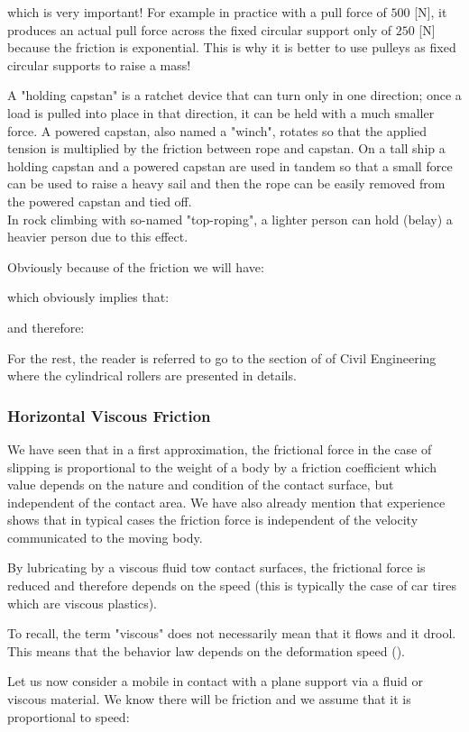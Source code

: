 	which is very important! For example in practice with a pull force of $500$ [N], it produces an actual pull force across the fixed circular support only of $250$ [N] because the friction is exponential. This is why it is better to use pulleys as fixed circular supports to raise a mass!
	\begin{tcolorbox}[title=Remark,colframe=black,arc=10pt]
	A "holding capstan" is a ratchet device that can turn only in one direction; once a load is pulled into place in that direction, it can be held with a much smaller force. A powered capstan, also named a "winch", rotates so that the applied tension is multiplied by the friction between rope and capstan. On a tall ship a holding capstan and a powered capstan are used in tandem so that a small force can be used to raise a heavy sail and then the rope can be easily removed from the powered capstan and tied off.\\
	
	In rock climbing with so-named "top-roping", a lighter person can hold (belay) a heavier person due to this effect.
	\end{tcolorbox}
	Obviously because of the friction we will have:
	
	which obviously implies that:
	
	and therefore:
	
	For the rest, the reader is referred to go to the section of of Civil Engineering where the cylindrical rollers are presented in details.
	
	\subsubsection{Horizontal Viscous Friction}
	We have seen that in a first approximation, the frictional force in the case of slipping is proportional to the weight of a body by a friction coefficient which value depends on the nature and condition of the contact surface, but independent of the contact area. We have also already mention that experience shows that in typical cases the friction force is independent of the velocity communicated to the moving body.

	By lubricating by a viscous fluid tow contact surfaces, the frictional force is reduced and therefore depends on the speed (this is typically the case of car tires which are viscous plastics).
	\begin{tcolorbox}[title=Remark,colframe=black,arc=10pt]
	To recall, the term "viscous" does not necessarily mean that it flows and it drool. This means that the behavior law depends on the deformation speed ().
	\end{tcolorbox}
	Let us now consider a mobile in contact with a plane support via a fluid or viscous material. We know there will be friction and we assume that it is proportional to speed:
	
